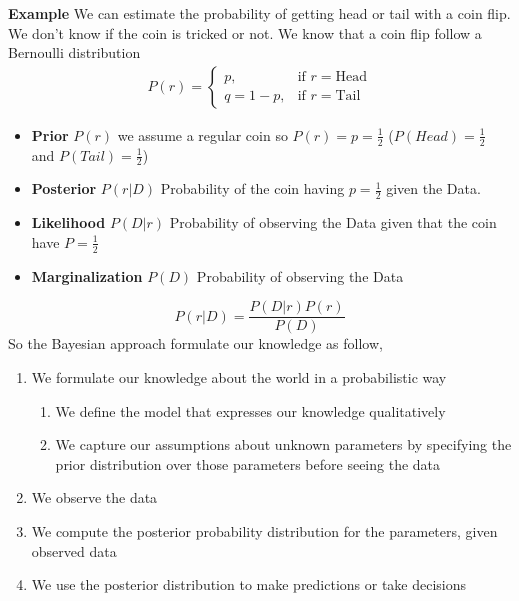 \documentclass[main.tex]{subfiles}
\begin{document}
\textbf{Example} We can estimate the probability of getting head or tail with a coin flip. We don't know if the coin is tricked or not.
We know that a coin flip follow a Bernoulli distribution
\begin{align*}
    P(r)= 
    \begin{cases}
        p,& \text{if } r = \text{Head}\\
        q=1-p,& \text{if } r = \text{Tail}
    \end{cases}
\end{align*}
\begin{itemize}
    \item \textbf{Prior} $P(r)$ we assume a regular coin so $P(r) = p = \frac{1}{2}$ ($P(Head)=\frac{1}{2}$ and $P(Tail)=\frac{1}{2}$)
    \item \textbf{Posterior} $P(r|D)$ Probability of the coin having $p=\frac{1}{2}$ given the Data.
    \item \textbf{Likelihood} $P(D|r)$ Probability of observing the Data given that the coin have $P=\frac{1}{2}$
    \item \textbf{Marginalization} $P(D)$ Probability of observing the Data
\end{itemize}
\begin{equation*}
    P(r|D) = \frac{P(D|r)P(r)}{P(D)}
\end{equation*}
So the Bayesian approach formulate our knowledge as follow,
\begin{enumerate}
    \item We formulate our knowledge about the world in a probabilistic way
    \begin{enumerate}
        \item We define the model that expresses our knowledge qualitatively
        \item We capture our assumptions about unknown parameters by specifying the
prior distribution over those parameters before seeing the data
    \end{enumerate}
    \item We observe the data
    \item We compute the posterior probability distribution for the parameters, given observed data
    \item We use the posterior distribution to make predictions or take decisions
\end{enumerate}
\end{document}
